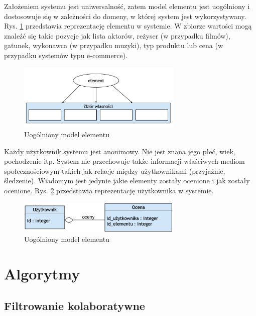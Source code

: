 \documentclass[twoside]{iisthesis}
\begin{document}
 Założeniem systemu jest uniwersalność, zatem model elementu jest uogólniony i dostosowuje się w zależności do domeny, w której system jest wykorzystywany. Rys. \ref{fig:modelElementu} przedstawia reprezentację elementu w systemie. W zbiorze wartości mogą znaleźć się takie pozycje jak lista aktorów, reżyser (w przypadku filmów), gatunek, wykonawca (w przypadku muzyki), typ produktu lub cena (w przypadku systemów typu e-commerce).
 
 \begin{figure}[!ht] 
 	\centering
 	\includegraphics[width=0.7\textwidth]{modelElementu}
 	\caption{Uogólniony model elementu}
 	\label{fig:modelElementu}
 \end{figure}
 
 Każdy użytkownik systemu jest anonimowy. Nie jest znana jego płeć, wiek, pochodzenie itp. System nie przechowuje także informacji właściwych mediom społecznościowym takich jak relacje między użytkownikami (przyjaźnie, śledzenie). Wiadomym jest jedynie jakie elementy zostały ocenione i jak zostały ocenione. Rys. \ref{fig:modelUsera} przedstawia reprezentację użytkownika w systemie.
 
 \begin{figure}[!ht] 
  	\centering
  	\includegraphics[width=0.7\textwidth]{modelUsera}
  	\caption{Uogólniony model elementu}
  	\label{fig:modelUsera}
  \end{figure}


 \chapter{Algorytmy}

	 \section{Filtrowanie kolaboratywne}
	 
\end{document}
